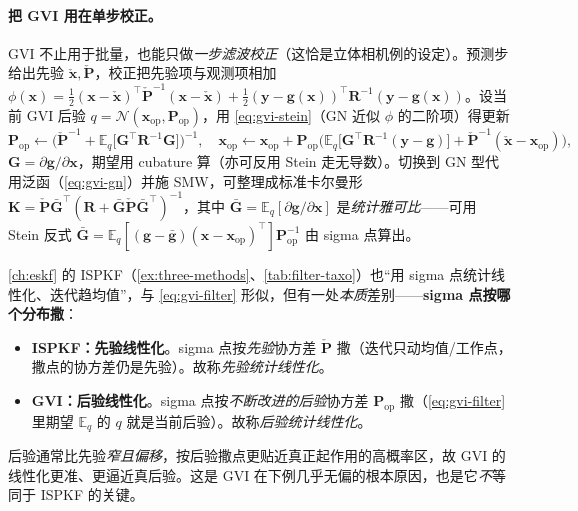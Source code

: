 \paragraph{把 GVI 用在单步校正。}
GVI 不止用于批量，也能只做\emph{一步滤波校正}（这恰是立体相机例的设定）。预测步给出先验 $\check{\mathbf{x}},\check{\mathbf{P}}$，校正把先验项与观测项相加 $\phi(\mathbf{x})=\tfrac12(\mathbf{x}-\check{\mathbf{x}})^\top\check{\mathbf{P}}^{-1}(\mathbf{x}-\check{\mathbf{x}})+\tfrac12(\mathbf{y}-\mathbf{g}(\mathbf{x}))^\top\mathbf{R}^{-1}(\mathbf{y}-\mathbf{g}(\mathbf{x}))$。设当前 GVI 后验 $q=\mathcal{N}(\mathbf{x}_{\mathrm{op}},\mathbf{P}_{\mathrm{op}})$，用 \cref{eq:gvi-stein}（GN 近似 $\phi$ 的二阶项）得更新
\begin{equation}
  \mathbf{P}_{\mathrm{op}}\leftarrow\Big(\check{\mathbf{P}}^{-1}+\mathbb{E}_q\big[\mathbf{G}^\top\mathbf{R}^{-1}\mathbf{G}\big]\Big)^{-1},\quad
  \mathbf{x}_{\mathrm{op}}\leftarrow\mathbf{x}_{\mathrm{op}}+\mathbf{P}_{\mathrm{op}}\Big(\mathbb{E}_q\big[\mathbf{G}^\top\mathbf{R}^{-1}(\mathbf{y}-\mathbf{g})\big]+\check{\mathbf{P}}^{-1}(\check{\mathbf{x}}-\mathbf{x}_{\mathrm{op}})\Big),
  \label{eq:gvi-filter}
\end{equation}
$\mathbf{G}=\partial\mathbf{g}/\partial\mathbf{x}$，期望用 cubature 算（亦可反用 Stein 走无导数）。切换到 GN 型代用泛函（\cref{eq:gvi-gn}）并施 SMW，可整理成标准卡尔曼形 $\mathbf{K}=\check{\mathbf{P}}\bar{\mathbf{G}}^\top(\mathbf{R}+\bar{\mathbf{G}}\check{\mathbf{P}}\bar{\mathbf{G}}^\top)^{-1}$，其中 $\bar{\mathbf{G}}=\mathbb{E}_q[\partial\mathbf{g}/\partial\mathbf{x}]$ 是\emph{统计雅可比}——可用 Stein 反式 $\bar{\mathbf{G}}=\mathbb{E}_q[(\mathbf{g}-\bar{\mathbf{g}})(\mathbf{x}-\mathbf{x}_{\mathrm{op}})^\top]\mathbf{P}_{\mathrm{op}}^{-1}$ 由 sigma 点算出。

\begin{insight}
\cref{ch:eskf} 的 ISPKF（\cref{ex:three-methods}、\cref{tab:filter-taxo}）也“用 sigma 点统计线性化、迭代趋均值”，与 \cref{eq:gvi-filter} 形似，但有一处\emph{本质}差别——\textbf{sigma 点按哪个分布撒}：
\begin{itemize}
  \item \textbf{ISPKF：先验线性化}。sigma 点按\emph{先验}协方差 $\check{\mathbf{P}}$ 撒（迭代只动均值/工作点，撒点的协方差仍是先验）。故称\emph{先验统计线性化}。
  \item \textbf{GVI：后验线性化}。sigma 点按\emph{不断改进的后验}协方差 $\mathbf{P}_{\mathrm{op}}$ 撒（\cref{eq:gvi-filter} 里期望 $\mathbb{E}_q$ 的 $q$ 就是当前后验）。故称\emph{后验统计线性化}。
\end{itemize}
后验通常比先验\emph{窄且偏移}，按后验撒点更贴近真正起作用的高概率区，故 GVI 的线性化更准、更逼近真后验。这是 GVI 在下例几乎无偏的根本原因，也是它\emph{不}等同于 ISPKF 的关键\cite{barfoot2024state}。
\end{insight}

